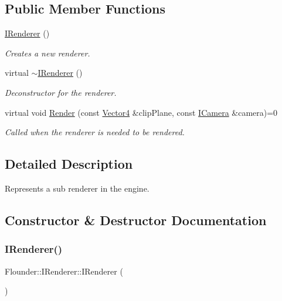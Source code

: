 \subsection*{Public Member Functions}
\begin{DoxyCompactItemize}
\item 
\hyperlink{class_flounder_1_1_i_renderer_a218fb009e69238f00c289eb61e0f1252}{I\+Renderer} ()
\begin{DoxyCompactList}\small\item\em Creates a new renderer. \end{DoxyCompactList}\item 
virtual \hyperlink{class_flounder_1_1_i_renderer_a0f8b50fb245f566a680f6d36710d6142}{$\sim$\+I\+Renderer} ()
\begin{DoxyCompactList}\small\item\em Deconstructor for the renderer. \end{DoxyCompactList}\item 
virtual void \hyperlink{class_flounder_1_1_i_renderer_a4e86d6621f6f63442e1c07655afd9daa}{Render} (const \hyperlink{class_flounder_1_1_vector4}{Vector4} \&clip\+Plane, const \hyperlink{class_flounder_1_1_i_camera}{I\+Camera} \&camera)=0
\begin{DoxyCompactList}\small\item\em Called when the renderer is needed to be rendered. \end{DoxyCompactList}\end{DoxyCompactItemize}


\subsection{Detailed Description}
Represents a sub renderer in the engine. 



\subsection{Constructor \& Destructor Documentation}
\mbox{\label{class_flounder_1_1_i_renderer_a218fb009e69238f00c289eb61e0f1252}} 
\subsubsection{\texorpdfstring{I\+Renderer()}{IRenderer()}}
{\footnotesize\ttfamily Flounder\+::\+I\+Renderer\+::\+I\+Renderer (\begin{DoxyParamCaption}{ }\end{DoxyParamCaption})\hspace{0.3cm}{\ttfamily [inline]}}



